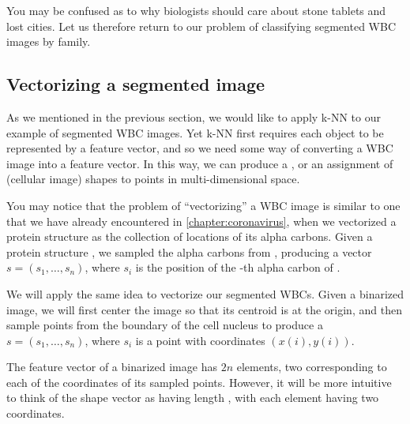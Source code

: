 You may be confused as to why biologists should care about stone tablets and lost cities. Let us therefore return to our problem of classifying segmented WBC images by family.

\FloatBarrier
{}
\subsection{Vectorizing a segmented image}

As we mentioned in the previous section, we would like to apply k-NN to our example of segmented WBC images. Yet k-NN first requires each object to be represented by a feature vector, and so we need some way of converting a WBC image into a feature vector. In this way, we can produce a , or an assignment of (cellular image) shapes to points in multi-dimensional space.

You may notice that the problem of ``vectorizing'' a WBC image is similar to one that we have already encountered in \autoref{chapter:coronavirus}, when we vectorized a protein structure as the collection of locations of its alpha carbons. Given a protein structure , we sampled the  alpha carbons from , producing a vector $s = (s_1, \ldots, s_n)$, where $s_i$ is the position of the -th alpha carbon of .

We will apply the same idea to vectorize our segmented WBCs. Given a binarized image, we will first center the image so that its centroid is at the origin, and then sample  points from the boundary of the cell nucleus to produce a  $s = (s_1, \ldots, s_n)$, where $s_i$ is a point with coordinates $(x(i), y(i))$.\\

\begin{note}\end{note}

The feature vector of a binarized image has $2n$ elements, two corresponding to each of the coordinates of its  sampled points. However, it will be more intuitive to think of the shape vector as having length , with each element having two coordinates.

